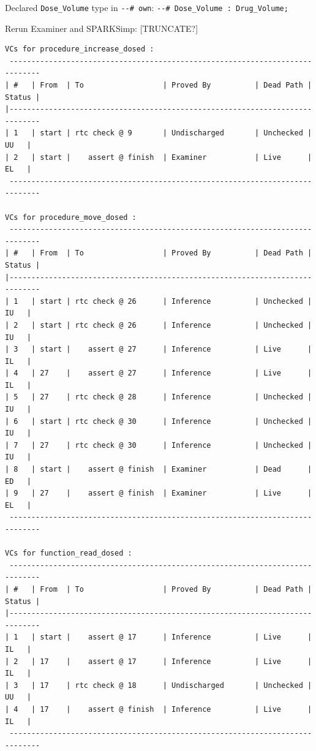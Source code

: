 Declared \lstinline{Dose_Volume} type in \lstinline{--# own}: \lstinline{--# Dose_Volume : Drug_Volume;}

Rerun Examiner and SPARKSimp:
[TRUNCATE?]
\singlespacing
\begin{lstlisting}[frame=single, gobble=0, caption={Second POGS report}]
VCs for procedure_increase_dosed :
 -----------------------------------------------------------------------------
| #   | From  | To                  | Proved By          | Dead Path | Status |
|-----------------------------------------------------------------------------
| 1   | start | rtc check @ 9       | Undischarged       | Unchecked |   UU   |
| 2   | start |    assert @ finish  | Examiner           | Live      |   EL   |
 -----------------------------------------------------------------------------

VCs for procedure_move_dosed :
 -----------------------------------------------------------------------------
| #   | From  | To                  | Proved By          | Dead Path | Status |
|-----------------------------------------------------------------------------
| 1   | start | rtc check @ 26      | Inference          | Unchecked |   IU   |
| 2   | start | rtc check @ 26      | Inference          | Unchecked |   IU   |
| 3   | start |    assert @ 27      | Inference          | Live      |   IL   |
| 4   | 27    |    assert @ 27      | Inference          | Live      |   IL   |
| 5   | 27    | rtc check @ 28      | Inference          | Unchecked |   IU   |
| 6   | start | rtc check @ 30      | Inference          | Unchecked |   IU   |
| 7   | 27    | rtc check @ 30      | Inference          | Unchecked |   IU   |
| 8   | start |    assert @ finish  | Examiner           | Dead      |   ED   |
| 9   | 27    |    assert @ finish  | Examiner           | Live      |   EL   |
 -----------------------------------------------------------------------------

VCs for function_read_dosed :
 -----------------------------------------------------------------------------
| #   | From  | To                  | Proved By          | Dead Path | Status |
|-----------------------------------------------------------------------------
| 1   | start |    assert @ 17      | Inference          | Live      |   IL   |
| 2   | 17    |    assert @ 17      | Inference          | Live      |   IL   |
| 3   | 17    | rtc check @ 18      | Undischarged       | Unchecked |   UU   |
| 4   | 17    |    assert @ finish  | Inference          | Live      |   IL   |
 -----------------------------------------------------------------------------


\end{lstlisting}
